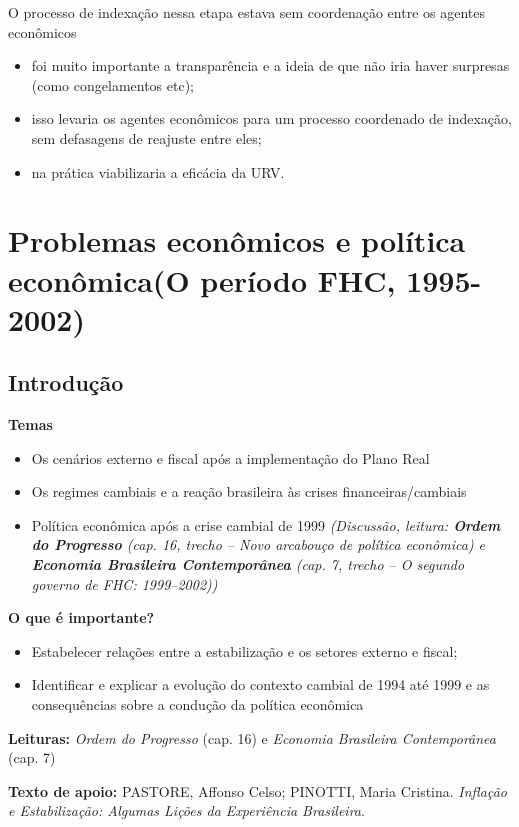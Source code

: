 \documentclass[a4paper,12pt]{article}[abntex2]
\begin{document}
O processo de indexação nessa etapa estava sem coordenação entre os agentes econômicos\begin{itemize}
    \item foi muito importante a transparência e a ideia de que não iria haver surpresas (como congelamentos etc); 
    \item isso levaria os agentes econômicos para um processo coordenado de indexação, sem defasagens de reajuste entre eles;
    \item na prática viabilizaria a eficácia da URV.
\end{itemize}

\newpage
\section{\textbf{Problemas econômicos e política econômica(O período FHC, 1995-2002)}}
\subsection{\textbf{Introdução}}
\textbf{Temas}
\begin{itemize}
  \item Os cenários externo e fiscal após a implementação do Plano Real
  \item Os regimes cambiais e a reação brasileira às crises financeiras/cambiais
  \item Política econômica após a crise cambial de 1999 \textit{(Discussão, leitura: \textbf{Ordem do Progresso} (cap. 16, trecho – Novo arcabouço de política econômica) e \textbf{Economia Brasileira Contemporânea} (cap. 7, trecho – O segundo governo de FHC: 1999–2002))}
\end{itemize}


\textbf{O que é importante?}
\begin{itemize}
  \item Estabelecer relações entre a estabilização e os setores externo e fiscal;
  \item Identificar e explicar a evolução do contexto cambial de 1994 até 1999 e as consequências sobre a condução da política econômica
\end{itemize}


\textbf{Leituras:} \textit{Ordem do Progresso} (cap. 16) e \textit{Economia Brasileira Contemporânea} (cap. 7)


\textbf{Texto de apoio:} PASTORE, Affonso Celso; PINOTTI, Maria Cristina. \textit{Inflação e Estabilização: Algumas Lições da Experiência Brasileira}. 
\end{document}
